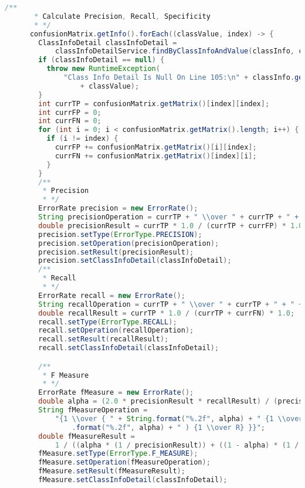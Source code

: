 \begin{lstlisting}[language=Java,basicstyle=\tiny,caption=TestingController.java]
      /**
       * Calculate Precision, Recall, Specificity
       * */
      confusionMatrix.getInfo().forEach((classValue, index) -> {
        ClassInfoDetail classInfoDetail =
            classInfoDetailService.findByClassInfoAndValue(classInfo, classValue);
        if (classInfoDetail == null) {
          throw new RuntimeException(
              "Class Info Detail Is Null On Line 105:\n" + classInfo.getClassName() + " - "
                  + classValue);
        }
        int currTP = confusionMatrix.getMatrix()[index][index];
        int currFP = 0;
        int currFN = 0;
        for (int i = 0; i < confusionMatrix.getMatrix().length; i++) {
          if (i != index) {
            currFP += confusionMatrix.getMatrix()[i][index];
            currFN += confusionMatrix.getMatrix()[index][i];
          }
        }
        /**
         * Precision
         * */
        ErrorRate precision = new ErrorRate();
        String precisionOperation = currTP + " \\over " + currTP + " + " + currFP;
        double precisionResult = currTP * 1.0 / (currTP + currFP) * 1.0;
        precision.setType(ErrorType.PRECISION);
        precision.setOperation(precisionOperation);
        precision.setResult(precisionResult);
        precision.setClassInfoDetail(classInfoDetail);
        /**
         * Recall
         * */
        ErrorRate recall = new ErrorRate();
        String recallOperation = currTP + " \\over " + currTP + " + " + currFN;
        double recallResult = currTP * 1.0 / (currTP + currFN) * 1.0;
        recall.setType(ErrorType.RECALL);
        recall.setOperation(recallOperation);
        recall.setResult(recallResult);
        recall.setClassInfoDetail(classInfoDetail);

        /**
         * F Measure
         * */
        ErrorRate fMeasure = new ErrorRate();
        double alpha = (2.0 * precisionResult * recallResult) / (precisionResult + recallResult);
        String fMeasureOperation =
            "{1 \\over { " + String.format("%.2f", alpha) + " {1 \\over P}+(1- " + String
                .format("%.2f", alpha) + " ) {1 \\over R} }}";
        double fMeasureResult =
            1 / ((alpha * (1 / precisionResult)) + ((1 - alpha) * (1 / recallResult)));
        fMeasure.setType(ErrorType.F_MEASURE);
        fMeasure.setOperation(fMeasureOperation);
        fMeasure.setResult(fMeasureResult);
        fMeasure.setClassInfoDetail(classInfoDetail);


\end{lstlisting}
